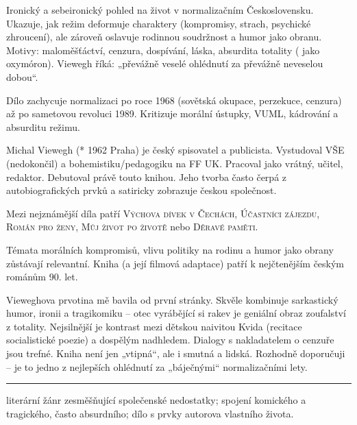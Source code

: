 \documentclass[FGBook.tex]{subfiles}
\begin{document}
\noindent Ironický a sebeironický pohled na život v normalizačním Československu. Ukazuje, jak režim deformuje charaktery (kompromisy, strach, psychické zhroucení), ale zároveň oslavuje rodinnou soudržnost a humor jako obranu. Motivy: maloměšťáctví, cenzura, dospívání, láska, absurdita totality ( jako oxymóron). Viewegh říká: „převážně veselé ohlédnutí za převážně neveselou dobou“.

\vspace*{2em}

\noindent Dílo zachycuje normalizaci po roce 1968 (sovětská okupace, perzekuce, cenzura) až po sametovou revoluci 1989. Kritizuje morální ústupky, VUML, kádrování a absurditu režimu.

\noindent Michal Viewegh (* 1962 Praha) je český spisovatel a publicista. Vystudoval VŠE (nedokončil) a bohemistiku/pedagogiku na FF UK. Pracoval jako vrátný, učitel, redaktor. Debutoval právě touto knihou. Jeho tvorba často čerpá z autobiografických prvků a satiricky zobrazuje českou společnost.

\noindent Mezi nejznámější díla patří \textsc{Výchova dívek v Čechách}, \textsc{Účastníci zájezdu}, \textsc{Román pro ženy}, \textsc{Můj život po životě} nebo \textsc{Děravé paměti}.

\noindent Témata morálních kompromisů, vlivu politiky na rodinu a humor jako obrany zůstávají relevantní. Kniha (a její filmová adaptace) patří k nejčtenějším českým románům 90. let.

\vspace*{2em}
\noindent Vieweghova prvotina mě bavila od první stránky. Skvěle kombinuje sarkastický humor, ironii a tragikomiku – otec vyrábějící si rakev je geniální obraz zoufalství z totality. Nejsilnější je kontrast mezi dětskou naivitou Kvida (recitace socialistické poezie) a dospělým nadhledem. Dialogy s nakladatelem o cenzuře jsou trefné. Kniha není jen „vtipná“, ale i smutná a lidská. Rozhodně doporučuji – je to jedno z nejlepších ohlédnutí za „báječnými“ normalizačními lety.

\vfill

\noindent\begin{minipage}{\textwidth}
    {\textcolor{\wpagecolor}{\rule{\linewidth}{0.4pt}}
    \footnotesize
     literární žánr zesměšňující společenské nedostatky; 
     spojení komického a tragického, často absurdního; 
     dílo s prvky autorova vlastního života.
    }
\end{minipage}

\newpage
\end{document}
